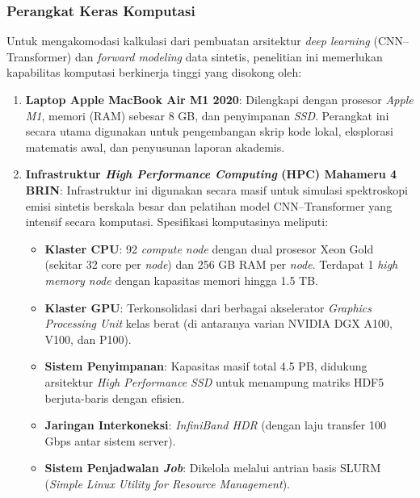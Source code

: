 \documentclass[12pt, a4paper]{article}
\begin{document}
\subsubsection{Perangkat Keras Komputasi}
Untuk mengakomodasi kalkulasi dari pembuatan arsitektur \textit{deep learning} (CNN--Transformer) dan \textit{forward modeling} data sintetis, penelitian ini memerlukan kapabilitas komputasi berkinerja tinggi yang disokong oleh:
\begin{enumerate}
    \item \textbf{Laptop Apple MacBook Air M1 2020}: Dilengkapi dengan prosesor \textit{Apple M1}, memori (RAM) sebesar 8 GB, dan penyimpanan \textit{SSD}. Perangkat ini secara utama digunakan untuk pengembangan skrip kode lokal, eksplorasi matematis awal, dan penyusunan laporan akademis.
    \item \textbf{Infrastruktur \textit{High Performance Computing} (HPC) Mahameru 4 BRIN}: Infrastruktur ini digunakan secara masif untuk simulasi spektroskopi emisi sintetis berskala besar dan pelatihan model CNN--Transformer yang intensif secara komputasi. Spesifikasi komputasinya meliputi:
    \begin{itemize}
        \item \textbf{Klaster CPU}: 92 \textit{compute node} dengan dual prosesor Xeon Gold (sekitar 32 core per \textit{node}) dan 256 GB RAM per \textit{node}. Terdapat 1 \textit{high memory node} dengan kapasitas memori hingga 1.5 TB.
        \item \textbf{Klaster GPU}: Terkonsolidasi dari berbagai akselerator \textit{Graphics Processing Unit} kelas berat (di antaranya varian NVIDIA DGX A100, V100, dan P100).
        \item \textbf{Sistem Penyimpanan}: Kapasitas masif total 4.5 PB, didukung arsitektur \textit{High Performance SSD} untuk menampung matriks HDF5 berjuta-baris dengan efisien.
        \item \textbf{Jaringan Interkoneksi}: \textit{InfiniBand HDR} (dengan laju transfer 100 Gbps antar sistem server).
        \item \textbf{Sistem Penjadwalan \textit{Job}}: Dikelola melalui antrian basis SLURM (\textit{Simple Linux Utility for Resource Management}).
    \end{itemize}
\end{enumerate}
\end{document}
